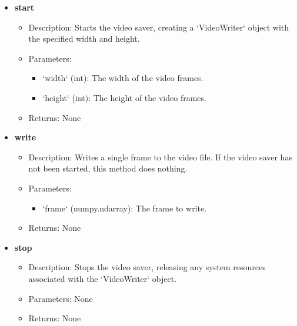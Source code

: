 \documentclass{article}
\begin{document}
\begin{itemize}
    \item \textbf{start}
        \begin{itemize}
            \item Description: Starts the video saver, creating a `VideoWriter` object with the specified width and height.
            \item Parameters:
                \begin{itemize}
                    \item `width` (int): The width of the video frames.
                    \item `height` (int): The height of the video frames.
                \end{itemize}
            \item Returns: None
        \end{itemize}
    \item \textbf{write}
        \begin{itemize}
            \item Description: Writes a single frame to the video file. If the video saver has not been started, this method does nothing.
            \item Parameters:
                \begin{itemize}
                    \item `frame` (numpy.ndarray): The frame to write.
                \end{itemize}
            \item Returns: None
        \end{itemize}
    \item \textbf{stop}
        \begin{itemize}
            \item Description: Stops the video saver, releasing any system resources associated with the `VideoWriter` object.
            \item Parameters: None
            \item Returns: None
        \end{itemize}
\end{itemize}
\end{document}
